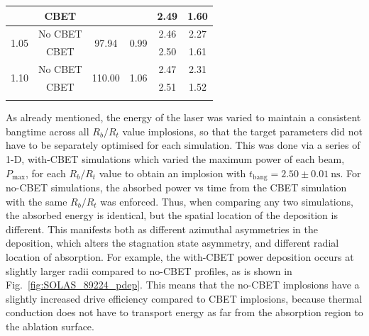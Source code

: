 \begin{table}[]
\begin{tabular}{cccccc}
                          & CBET    &                                                                                    &                                                                         & 2.49                                                                      & 1.60                                 \\ \hline
    \multirow{2}{*}{1.05} & No CBET & \multirow{2}{*}{97.94}                                                             & \multirow{2}{*}{0.99}                                                   & 2.46                                                                      & 2.27                                 \\
                          & CBET    &                                                                                    &                                                                         & 2.50                                                                      & 1.61                                 \\ \hline
    \multirow{2}{*}{1.10} & No CBET & \multirow{2}{*}{110.00}                                                            & \multirow{2}{*}{1.06}                                                   & 2.47                                                                      & 2.31                                 \\
                          & CBET    &                                                                                    &                                                                         & 2.51                                                                      & 1.52                                 \\ \hhline{======}
    \end{tabular}
    \label{tab:res1_1d_tuning}
\end{table}
\egroup%

As already mentioned, the energy of the laser was varied to maintain a consistent bangtime across all $R_b/R_t$ value implosions, so that the target parameters did not have to be separately optimised for each simulation.
This was done via a series of 1-D, with-\ac{CBET} simulations which varied the maximum power of each beam, $P_{\text{max}}$, for each $R_b/R_t$ value to obtain an implosion with $t_{\text{bang}}=2.50 \pm 0.01\ \text{ns}$.
For no-\ac{CBET} simulations, the absorbed power vs time from the \ac{CBET} simulation with the same $R_b/R_t$ was enforced.
Thus, when comparing any two simulations, the absorbed energy is identical, but the spatial location of the deposition is different.
This manifests both as different azimuthal asymmetries in the deposition, which alters the stagnation state asymmetry, and different radial location of absorption.
For example, the with-\ac{CBET} power deposition occurs at slightly larger radii compared to no-\ac{CBET} profiles, as is shown in Fig.~\ref{fig:SOLAS_89224_pdep}.
This means that the no-\ac{CBET} implosions have a slightly increased drive efficiency compared to \ac{CBET} implosions, because thermal conduction does not have to transport energy as far from the absorption region to the ablation surface.

